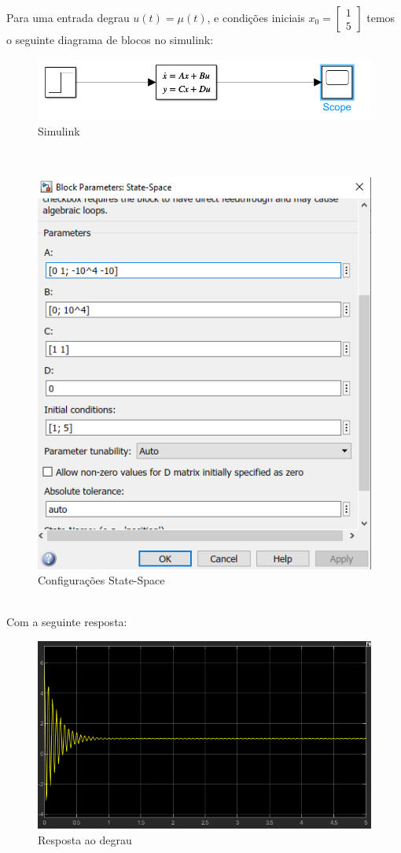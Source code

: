 \documentclass[a4paper, 12pt]{article}
\begin{document}
	Para uma entrada degrau $u(t) = \mu(t)$, e condições iniciais $x_0 = \begin{bmatrix}
	1 \\ 5
	\end{bmatrix}$ temos o seguinte diagrama de blocos no simulink: 
	\begin{figure}[h]
		\centering
		\includegraphics[scale=0.5]{imagens/a5.png}
		\caption{Simulink}
	\end{figure}\\
	\begin{figure}[h]
		\centering
		\includegraphics[scale=0.5]{imagens/a6.png}
		\caption{Configurações State-Space}
	\end{figure}\\
	\newpage
	Com a seguinte resposta:
	\begin{figure}[h]
		\centering
		\includegraphics[scale=0.7]{imagens/a7.png}
		\caption{Resposta ao degrau}
	\end{figure}\\
	
\end{document}
